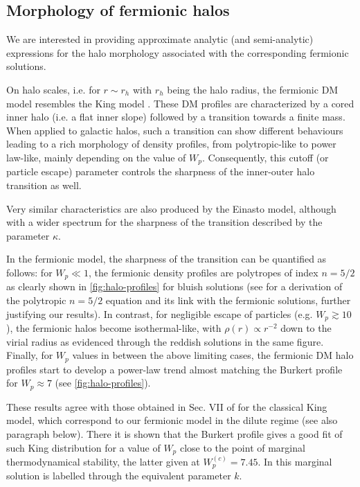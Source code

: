 \subsection{Morphology of fermionic halos}
\label{sec:morph}

We are interested in providing approximate analytic (and semi-analytic) expressions for the halo morphology associated with the corresponding fermionic solutions.

On halo scales, i.e. for $r \sim r_h$ with $r_h$ being the halo radius, the fermionic DM model resembles the King model \citep{1966AJ.....71...64K}. These DM profiles are characterized by a cored inner halo (i.e. a flat inner slope) followed by a transition towards a finite mass. When applied to galactic halos, such a transition can show different behaviours leading to a rich morphology of density profiles, from polytropic-like to power law-like, mainly depending on the value of $W_p$. Consequently, this cutoff (or particle escape) parameter controls the sharpness of the inner-outer halo transition as well.

Very similar characteristics are also produced by the Einasto model, although with a wider spectrum for the sharpness of the transition described by the parameter $\kappa$.

In the fermionic model, the sharpness of the transition can be quantified as follows: for $W_p\ll 1$, the fermionic density profiles are polytropes of index $n=5/2$ as clearly shown in \cref{fig:halo-profiles} for bluish solutions (see \citealp{2015PhRvD..92l3527C} for a derivation of the polytropic $n=5/2$ equation and its link with the fermionic solutions, further justifying our results). In contrast, for negligible escape of particles (e.g. $W_p \gtrsim 10$), the fermionic halos become isothermal-like, with $\rho(r) \propto r^{-2}$ down to the virial radius as evidenced through the reddish solutions in the same figure. Finally, for $W_p$ values in between the above limiting cases, the fermionic DM halo profiles start to develop a power-law trend almost matching the Burkert profile for $W_p\approx 7$ (see \cref{fig:halo-profiles}).

These results agree with those obtained in Sec. VII of \citet{2015PhRvD..91f3531C} for the classical King model, which correspond to our fermionic model in the dilute regime (see also paragraph below). There it is shown that the Burkert profile gives a good fit of such King distribution for a value of $W_p$ close to the point of marginal thermodynamical stability, the latter given at $W_p^{(c)} = 7.45$. In \citet{2015PhRvD..91f3531C} this marginal solution is labelled through the equivalent parameter $k$.

